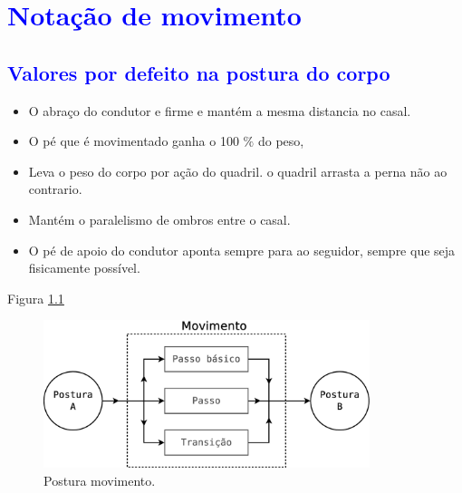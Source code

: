 




\chapter{\textcolor{blue}{Notação de movimento}}





\section{\textcolor{blue}{Valores por defeito na postura do corpo}}


\begin{itemize}
\item O abraço do condutor e firme e mantém a mesma distancia no casal.
\item O pé que é movimentado ganha o 100 $\%$ do peso,
\item Leva o peso do corpo por ação do quadril. o quadril arrasta a perna não ao contrario.
\item Mantém o paralelismo de ombros entre o casal.
\item O pé de apoio do condutor aponta sempre para ao seguidor, sempre que seja fisicamente possível.
\end{itemize}

Figura \ref{fig:postura-movimento}

\begin{figure}[h]
  \centering
    \includegraphics[width=0.85\textwidth]{chapters/cap-partituramov/postura-movimento.eps}
  \caption{Postura movimento.}
  \label{fig:postura-movimento}
\end{figure}


